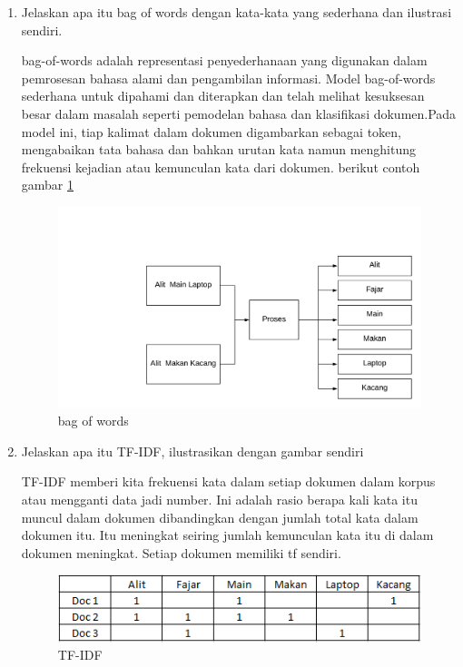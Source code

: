 \begin{enumerate}
\item Jelaskan apa itu bag of words dengan kata-kata yang sederhana dan ilustrasi sendiri.
\par bag-of-words adalah representasi penyederhanaan yang digunakan dalam pemrosesan bahasa alami dan pengambilan informasi. Model bag-of-words sederhana untuk dipahami dan diterapkan dan telah melihat kesuksesan besar dalam masalah seperti pemodelan bahasa dan klasiﬁkasi dokumen.Pada model ini, tiap kalimat dalam dokumen digambarkan sebagai token, mengabaikan tata bahasa dan bahkan urutan kata namun menghitung frekuensi kejadian atau kemunculan kata dari dokumen. berikut contoh gambar \ref{bag of words}
\begin{figure}[H]
\centering
\includegraphics[scale=0.5]{figures/1174057/chapter4/4.png}
\caption{bag of words}
\label{bag of words}
\end{figure}

\item Jelaskan apa itu TF-IDF, ilustrasikan dengan gambar sendiri
\par TF-IDF memberi kita frekuensi kata dalam setiap dokumen dalam korpus atau mengganti data jadi number. Ini adalah rasio berapa kali kata itu muncul dalam dokumen dibandingkan dengan jumlah total kata dalam dokumen itu. Itu meningkat seiring jumlah kemunculan kata itu di dalam dokumen meningkat. Setiap dokumen memiliki tf sendiri.
\begin{figure}[H]
\centering
\includegraphics[scale=0.6]{figures/1174057/chapter4/5.PNG}
\caption{TF-IDF}
\label{TF-IDF}
\end{figure}

\end{enumerate}

